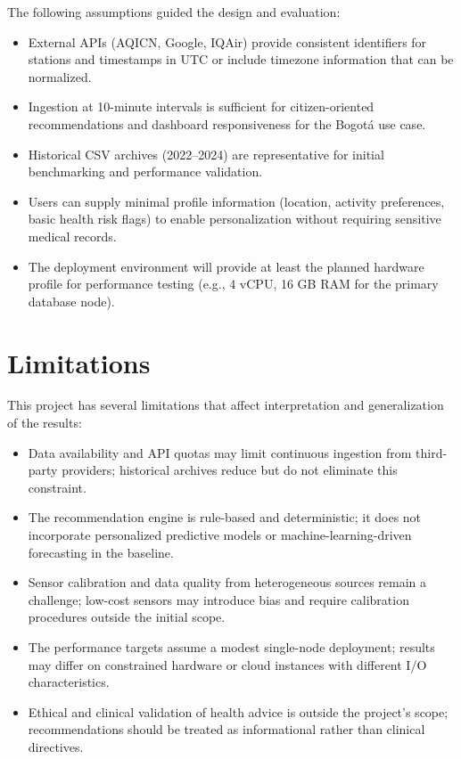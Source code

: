 The following assumptions guided the design and evaluation:
\begin{itemize}
    \item External APIs (AQICN, Google, IQAir) provide consistent identifiers for stations and timestamps in UTC or include timezone information that can be normalized.
    \item Ingestion at 10-minute intervals is sufficient for citizen-oriented recommendations and dashboard responsiveness for the Bogotá use case.
    \item Historical CSV archives (2022--2024) are representative for initial benchmarking and performance validation.
    \item Users can supply minimal profile information (location, activity preferences, basic health risk flags) to enable personalization without requiring sensitive medical records.
    \item The deployment environment will provide at least the planned hardware profile for performance testing (e.g., 4 vCPU, 16 GB RAM for the primary database node).
\end{itemize}

\section{Limitations}
\label{sec:method_limitations}

This project has several limitations that affect interpretation and generalization of the results:
\begin{itemize}
    \item Data availability and API quotas may limit continuous ingestion from third-party providers; historical archives reduce but do not eliminate this constraint.
    \item The recommendation engine is rule-based and deterministic; it does not incorporate personalized predictive models or machine-learning-driven forecasting in the baseline.
    \item Sensor calibration and data quality from heterogeneous sources remain a challenge; low-cost sensors may introduce bias and require calibration procedures outside the initial scope.
    \item The performance targets assume a modest single-node deployment; results may differ on constrained hardware or cloud instances with different I/O characteristics.
    \item Ethical and clinical validation of health advice is outside the project's scope; recommendations should be treated as informational rather than clinical directives.
\end{itemize}


